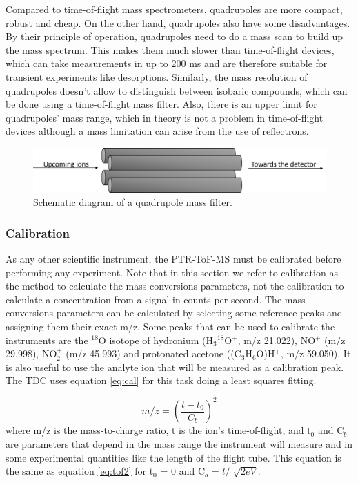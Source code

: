 Compared to time-of-flight mass spectrometers, quadrupoles are more compact, robust and cheap. On the other hand, quadrupoles also have some disadvantages. By their principle of operation, quadrupoles need to do a mass scan to build up the mass spectrum. This makes them much slower than time-of-flight devices, which can take measurements in up to 200 ms and are therefore suitable for transient experiments like desorptions. Similarly, the mass resolution of quadrupoles doesn't allow to distinguish between isobaric compounds, which can be done using a time-of-flight mass filter. Also, there is an upper limit for quadrupoles' mass range, which in theory is not a problem in time-of-flight devices although a mass limitation can arise from the use of reflectrons.

\begin{figure}%
\centering
\includegraphics[width=0.8\linewidth]{pics/quad.png}
\centering
\caption{Schematic diagram of a quadrupole mass filter.}
\label{fig:quad}
\end{figure}

\subsubsection{Calibration}
As any other scientific instrument, the PTR-ToF-MS must be calibrated before performing any experiment. Note that in this section we refer to calibration as the method to calculate the mass conversions parameters, not the calibration to calculate a concentration from a signal in counts per second. The mass conversions parameters can be calculated by selecting some reference peaks and assigning them their exact m/z. Some peaks that can be used to calibrate the instruments are the $^{18}$O isotope of hydronium (H$_3$$^{18}$O$^+$, m/z 21.022), NO$^{+}$ (m/z 29.998), NO$_2^{+}$ (m/z 45.993) and protonated acetone ((C$_3$H$_6$O)H$^+$, m/z 59.050). It is also useful to use the analyte ion that will be measured as a calibration peak. The TDC uses equation \ref{eq:cal} for this task doing a least squares fitting.

\begin{equation}
\label{eq:cal}
m\slash z =  \left(\frac{t-t_0}{C_b}\right)^2 
\end{equation}
where m/z is the mass-to-charge ratio, t is the ion's time-of-flight, and t$_0$ and C$_b$ are parameters that depend in the mass range the instrument will measure and in some experimental quantities like the length of the flight tube. This equation is the same as equation \ref{eq:tof2} for t$_0$ = 0 and C$_b$ = $l/\sqrt[]{2eV}$.


